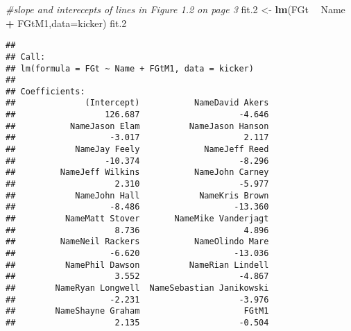 \documentclass[]{article}
\newenvironment{Shaded}{\begin{snugshade}}{\end{snugshade}}
\newcommand{\CommentTok}[1]{\textcolor[rgb]{0.56,0.35,0.01}{\textit{#1}}}
\newcommand{\DataTypeTok}[1]{\textcolor[rgb]{0.13,0.29,0.53}{#1}}
\newcommand{\FloatTok}[1]{\textcolor[rgb]{0.00,0.00,0.81}{#1}}
\newcommand{\KeywordTok}[1]{\textcolor[rgb]{0.13,0.29,0.53}{\textbf{#1}}}
\newcommand{\NormalTok}[1]{#1}
\newcommand{\OperatorTok}[1]{\textcolor[rgb]{0.81,0.36,0.00}{\textbf{#1}}}
\newcommand{\StringTok}[1]{\textcolor[rgb]{0.31,0.60,0.02}{#1}}
\begin{document}
\begin{Shaded}
\begin{Highlighting}[]
\CommentTok{#slope and interecepts of lines in Figure 1.2 on page 3}
\NormalTok{fit}\FloatTok{.2}\NormalTok{ <-}\StringTok{ }\KeywordTok{lm}\NormalTok{(FGt }\OperatorTok{~}\StringTok{ }\NormalTok{Name }\OperatorTok{+}\StringTok{ }\NormalTok{FGtM1,}\DataTypeTok{data=}\NormalTok{kicker)}
\NormalTok{fit}\FloatTok{.2}
\end{Highlighting}
\end{Shaded}

\begin{verbatim}
## 
## Call:
## lm(formula = FGt ~ Name + FGtM1, data = kicker)
## 
## Coefficients:
##              (Intercept)           NameDavid Akers  
##                  126.687                    -4.646  
##           NameJason Elam          NameJason Hanson  
##                   -3.017                     2.117  
##            NameJay Feely             NameJeff Reed  
##                  -10.374                    -8.296  
##         NameJeff Wilkins           NameJohn Carney  
##                    2.310                    -5.977  
##            NameJohn Hall            NameKris Brown  
##                   -8.486                   -13.360  
##          NameMatt Stover       NameMike Vanderjagt  
##                    8.736                     4.896  
##         NameNeil Rackers           NameOlindo Mare  
##                   -6.620                   -13.036  
##          NamePhil Dawson          NameRian Lindell  
##                    3.552                    -4.867  
##        NameRyan Longwell  NameSebastian Janikowski  
##                   -2.231                    -3.976  
##        NameShayne Graham                     FGtM1  
##                    2.135                    -0.504
\end{verbatim}
\end{document}
